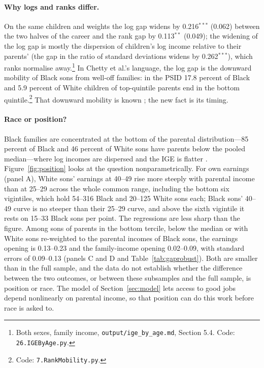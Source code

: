 \paragraph{Why logs and ranks differ.} On the same children and weights the log gap widens by 0.216$^{***}$ (0.062)
between the two halves of the career and the rank gap by 0.113$^{**}$ (0.049); the widening of the log gap is mostly
the dispersion of children's log income relative to their parents' (the gap in the ratio of standard deviations widens
by 0.262$^{***}$), which ranks normalise away.\footnote{Both sexes, family income, \texttt{output/ige\_by\_age.md},
Section 5.4. Code: \texttt{26.IGEByAge.py}.} In Chetty et al.'s language, the log gap is the downward mobility of
Black sons from well-off families: in the PSID 17.8 percent of Black and 5.9 percent of White children of top-quintile
parents end in the bottom quintile.\footnote{Code: \texttt{7.RankMobility.py}.} That downward mobility is known
\citep{hertz2005rags, bhattacharya2011nonparametric, mazumder2014black}; the new fact is its timing.

\paragraph{Race or position?} Black families are concentrated at the bottom of the parental distribution---85 percent
of Black and 46 percent of White sons have parents below the pooled median---where log incomes are dispersed and the
IGE is flatter \citep{bratsberg2007nonlinearities}. Figure~\ref{fig:position} looks at the question nonparametrically.
For own earnings (panel A), White sons' earnings at 40--49 rise more steeply with parental income than at 25--29 across
the whole common range, including the bottom six vigintiles, which hold 54--316 Black and 20--125 White sons each; Black
sons' 40--49 curve is no steeper than their 25--29 curve, and above the sixth vigintile it rests on 15--33 Black sons
per point. The regressions are less sharp than the figure. Among sons of parents in the bottom tercile, below the median
or with White sons re-weighted to the parental incomes of Black sons, the earnings opening is 0.13--0.23 and the
family-income opening 0.02--0.09, with standard errors of 0.09--0.13 (panels C and D and Table~\ref{tab:gaprobust}). Both
are smaller than in the full sample, and the data do not establish whether the difference between the two outcomes, or
between these subsamples and the full sample, is position or race. The model of Section~\ref{sec:model} lets access to
good jobs depend nonlinearly on parental income, so that position can do this work before race is asked to.

